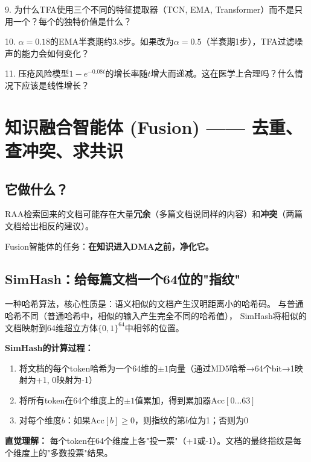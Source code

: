 \documentclass[11pt,a4paper]{ctexart}
\begin{document}
\begin{exerbox}[思考题 9--11]
9. 为什么TFA使用三个不同的特征提取器（TCN, EMA, Transformer）而不是只用一个？每个的独特价值是什么？

10. $\alpha=0.18$的EMA半衰期约3.8步。如果改为$\alpha=0.5$（半衰期1步），TFA过滤噪声的能力会如何变化？

11. 压疮风险模型$1-e^{-0.08t}$的增长率随$t$增大而递减。这在医学上合理吗？什么情况下应该是线性增长？
\end{exerbox}

\newpage

\section{知识融合智能体 (Fusion) —— 去重、查冲突、求共识}

\subsection{它做什么？}

RAA检索回来的文档可能存在大量\textbf{冗余}（多篇文档说同样的内容）和\textbf{冲突}（两篇文档给出相反的建议）。

Fusion智能体的任务：\textbf{在知识进入DMA之前，净化它。}

\subsection{SimHash：给每篇文档一个64位的"指纹"}

\begin{defbox}
一种哈希算法，核心性质是：语义相似的文档产生汉明距离小的哈希码。
与普通哈希不同（普通哈希中，相似的输入产生完全不同的哈希值），
SimHash将相似的文档映射到64维超立方体$\{0,1\}^{64}$中相邻的位置。
\end{defbox}

\textbf{SimHash的计算过程：}

\begin{enumerate}[nosep]
\item 将文档的每个token哈希为一个64维的$\pm 1$向量（通过MD5哈希→64个bit→1映射为+1, 0映射为-1）
\item 将所有token在64个维度上的$\pm 1$值累加，得到累加器$\text{Acc}[0\ldots63]$
\item 对每个维度$b$：如果$\text{Acc}[b] \geq 0$，则指纹的第$b$位为1；否则为0
\end{enumerate}

\textbf{直觉理解：} 每个token在64个维度上各"投一票"（+1或-1）。文档的最终指纹是每个维度上的"多数投票"结果。
\end{document}
